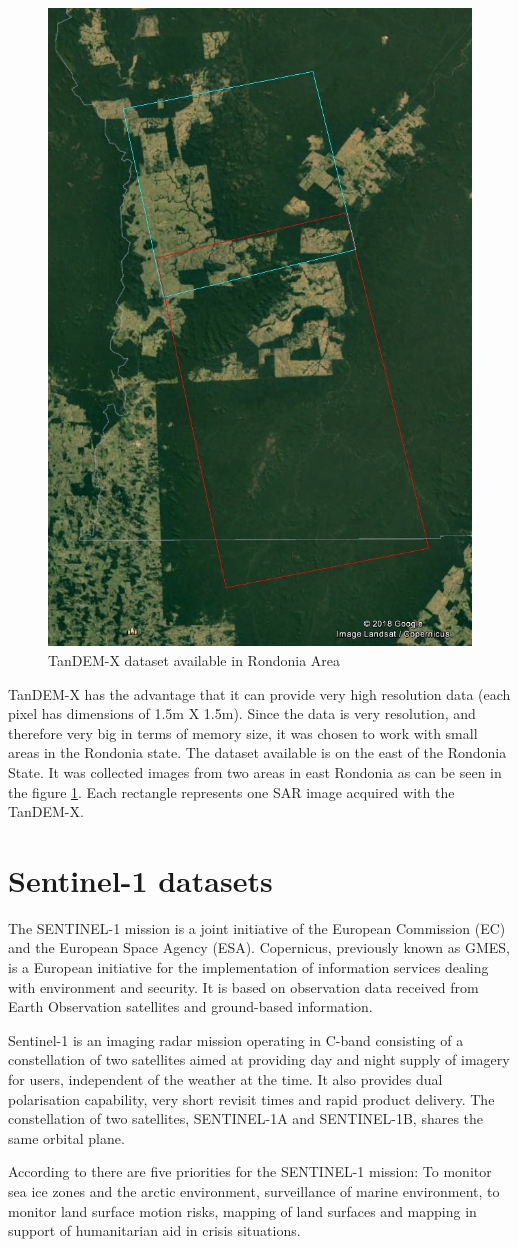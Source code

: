 \begin{figure}[H]
    \centering
    \includegraphics[width=0.6\linewidth]{Chapter2-real/tandem_dataset.jpg}
    \caption{TanDEM-X dataset available in Rondonia Area}
    \label{fig:tandem_dataset}
\end{figure}{}
TanDEM-X has the advantage that it can provide very high resolution data (each pixel has dimensions of  1.5m X 1.5m). Since the data is very resolution, and therefore very big in terms of memory size, it was chosen to work with small areas in the Rondonia state.
The dataset available is on the east of the Rondonia State. It was collected images from two areas in east Rondonia as can be seen in the figure \ref{fig:tandem_dataset}. Each rectangle represents one SAR image acquired with the TanDEM-X.

\section{Sentinel-1 datasets}
\par
The SENTINEL-1 mission is a joint initiative of the European Commission (EC) and the European Space Agency (ESA). Copernicus, previously known as GMES, is a European initiative for the implementation of information services dealing with environment and security. It is based on observation data received from Earth Observation satellites and ground-based information.

Sentinel-1 is an imaging radar mission operating in C-band consisting of a constellation of two satellites aimed at providing day and night supply of imagery for users, independent of the weather at the time.
It also provides dual polarisation capability, very short revisit times and rapid product delivery. 
The constellation of two satellites, SENTINEL-1A and SENTINEL-1B, shares the same orbital plane.
\par
According to \cite{sentinelmission} there are five priorities for the SENTINEL-1 mission: To monitor sea ice zones and the arctic environment, surveillance of marine environment, to monitor land surface motion risks, mapping of land surfaces and mapping in support of humanitarian aid in crisis situations.

